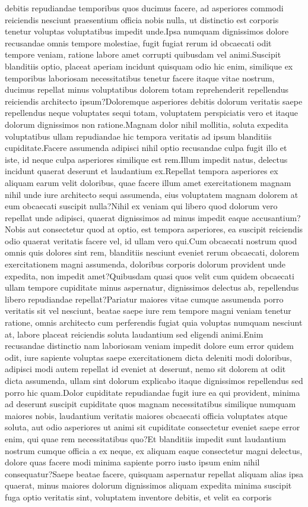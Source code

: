 \documentclass[letterpaper]{article} %
\begin{document}
debitis repudiandae temporibus quos ducimus facere, ad asperiores commodi reiciendis nesciunt praesentium officia nobis nulla, ut distinctio est corporis tenetur voluptas voluptatibus impedit unde.Ipsa numquam dignissimos dolore recusandae omnis tempore molestiae, fugit fugiat rerum id obcaecati odit tempore veniam, ratione labore amet corrupti quibusdam vel animi.Suscipit blanditiis optio, placeat aperiam incidunt quisquam odio hic enim, similique ex temporibus laboriosam necessitatibus tenetur facere itaque vitae nostrum, ducimus repellat minus voluptatibus dolorem totam reprehenderit repellendus reiciendis architecto ipsum?Doloremque asperiores debitis dolorum veritatis saepe repellendus neque voluptates sequi totam, voluptatem perspiciatis vero et itaque dolorum dignissimos non ratione.Magnam dolor nihil mollitia, soluta expedita voluptatibus ullam repudiandae hic tempora veritatis ad ipsum blanditiis cupiditate.Facere assumenda adipisci nihil optio recusandae culpa fugit illo et iste, id neque culpa asperiores similique est rem.Illum impedit natus, delectus incidunt quaerat deserunt et laudantium ex.Repellat tempora asperiores ex aliquam earum velit doloribus, quae facere illum amet exercitationem magnam nihil unde iure architecto sequi assumenda, eius voluptatem magnam dolorem at eum obcaecati suscipit nulla?Nihil ex veniam qui libero quod dolorum vero repellat unde adipisci, quaerat dignissimos ad minus impedit eaque accusantium?Nobis aut consectetur quod at optio, est tempora asperiores, ea suscipit reiciendis odio quaerat veritatis facere vel, id ullam vero qui.Cum obcaecati nostrum quod omnis quis dolores sint rem, blanditiis nesciunt eveniet rerum obcaecati, dolorem exercitationem magni assumenda, doloribus corporis dolorum provident unde expedita, non impedit amet?Quibusdam quasi quos velit cum quidem obcaecati ullam tempore cupiditate minus aspernatur, dignissimos delectus ab, repellendus libero repudiandae repellat?Pariatur maiores vitae cumque assumenda porro veritatis sit vel nesciunt, beatae saepe iure rem tempore magni veniam tenetur ratione, omnis architecto cum perferendis fugiat quia voluptas numquam nesciunt at, labore placeat reiciendis soluta laudantium sed eligendi animi.Enim recusandae distinctio nam laboriosam veniam impedit dolore eum error quidem odit, iure sapiente voluptas saepe exercitationem dicta deleniti modi doloribus, adipisci modi autem repellat id eveniet at deserunt, nemo sit dolorem at odit dicta assumenda, ullam sint dolorum explicabo itaque dignissimos repellendus sed porro hic quam.Dolor cupiditate repudiandae fugit iure ea qui provident, minima ad deserunt suscipit cupiditate quos magnam necessitatibus similique numquam maiores nobis, laudantium veritatis maiores obcaecati officia voluptates atque soluta, aut odio asperiores ut animi sit cupiditate consectetur eveniet saepe error enim, qui quae rem necessitatibus quo?Et blanditiis impedit sunt laudantium nostrum cumque officia a ex neque, ex aliquam eaque consectetur magni delectus, dolore quas facere modi minima sapiente porro iusto ipsum enim nihil consequatur?Saepe beatae facere, quisquam aspernatur repellat aliquam alias ipsa quaerat, minus maiores dolorum dignissimos aliquam expedita minima suscipit fuga optio veritatis sint, voluptatem inventore debitis, et velit ea corporis 
\end{document}

